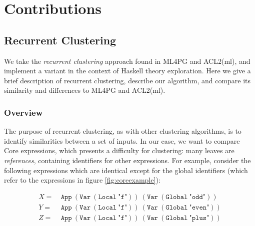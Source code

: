\section{Contributions}
\label{sec:contributions}

\subsection{Recurrent Clustering}
\label{sec:recurrentclustering}

We take the \emph{recurrent clustering} approach found in ML4PG and ACL2(ml), and implement a variant in the context of Haskell theory exploration. Here we give a brief description of recurrent clustering, describe our algorithm, and compare its similarity and differences to ML4PG and ACL2(ml).

\subsubsection{Overview}

\iffalse TODO: Much of this discussion reads as a minor implementation solution rather than an overview of the whole method \fi

\iffalse TODO: Focus the section more on the problem of identifiers, and how recurrent clustering uses clustering as part of feature extraction to solve this \fi

\iffalse TODO: Maybe present the translation from trees to matrices, to vectors first; leaving the conversion of terms to features until afterwards; similar to how ML4PG uses [foo] to mean ``the feature corresponding to foo, whatever that might be'' \fi

\iffalse TODO: Maybe present recurrent clustering in a ``naive'' way: define the conversion function ``[]'' recursively. Leave the dependency-ordering, etc. for the Algorithm section, as a way of ``building up to'' the result, which avoids the inefficiencies of recursing. \fi

The purpose of recurrent clustering, as with other clustering algorithms, is to identify similarities between a set of inputs. In our case, we want to compare Core expressions, which presents a difficulty for clustering: many leaves are \emph{references}, containing identifiers for other expressions. For example, consider the following expressions which are identical except for the global identifiers (which refer to the expressions in figure \ref{fig:coreexample}):

\begin{equation*}
  \begin{split}
    X =\ & \texttt{App}\ (\texttt{Var}\ (\texttt{Local}\ \texttt{"f"}))\ (\texttt{Var}\ (\texttt{Global}\ \texttt{"odd"})) \\
    Y =\ & \texttt{App}\ (\texttt{Var}\ (\texttt{Local}\ \texttt{"f"}))\ (\texttt{Var}\ (\texttt{Global}\ \texttt{"even"})) \\
    Z =\ & \texttt{App}\ (\texttt{Var}\ (\texttt{Local}\ \texttt{"f"}))\ (\texttt{Var}\ (\texttt{Global}\ \texttt{"plus"}))
  \end{split}
\end{equation*}

